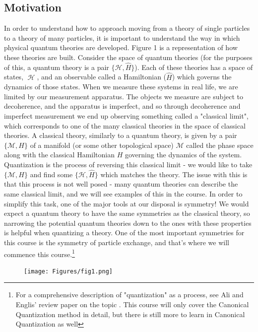 \documentclass{article}
\DeclareMathOperator{\Hh}{{\mathcal{H}}}
\begin{document}
\subsection{Motivation}
In order to understand how to approach moving from a theory of single particles to a theory of many particles, it is important to understand the way in which physical quantum theories are developed. Figure 1 is a representation of how these theories are built. Consider the space of quantum theories (for the purposes of this, a quantum theory is a pair $\{\mathcal{H},\hat H\}$). Each of these theories has a space of states, $\Hh$, and an observable called a Hamiltonian ($\hat H$) which governs the dynamics of those states. When we measure these systems in real life, we are limited by our measurement apparatus. The objects we measure are subject to decoherence, and the apparatus is imperfect, and so through decoherence and imperfect measurement we end up observing something called a "classical limit", which corresponds to one of the many classical theories in the space of classical theories. A classical theory, similarly to a quantum theory, is given by a pair $\{\mathcal{M},H\}$ of a manifold (or some other topological space) $\mathcal{M}$ called the phase space along with the classical Hamiltonian $H$ governing the dynamics of the system. Quantization is the process of reversing this classical limit - we would like to take $\{\mathcal{M},H\}$ and find some $\{\mathcal{H},\hat H\}$ which matches the theory. The issue with this is that this process is not well posed - many quantum theories can describe the same classical limit, and we will see examples of this in the course. In order to simplify this task, one of the major tools at our disposal is symmetry! We would expect a quantum theory to have the same symmetries as the classical theory, so narrowing the potential quantum theories down to the ones with these properties is helpful when quantizing a theory. One of the most important symmetries for this course is the symmetry of particle exchange, and that's where we will commence this course.\footnote{For a comprehensive description of "quantization" as a process, see Ali and Englis' review paper on the topic \cite{ali2005quantization}. This course will only cover the Canonical Quantization method in detail, but there is still more to learn in Canonical Quantization as well}
\begin{figure}[ht]
    \centering
    \texttt{[image: Figures/fig1.png]}
    \caption*{}
    \label{fig:fig11}
\end{figure}
\pagebreak
\end{document}
